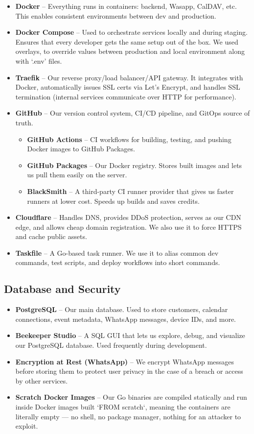 \begin{itemize}
    \item \textbf{Docker} – Everything runs in containers: backend, Wasapp, CalDAV, etc. This enables consistent environments between dev and production.
    \item \textbf{Docker Compose} – Used to orchestrate services locally and during staging. Ensures that every developer gets the same setup out of the box. We used overlays, to override values between production and local environment along with `.env' files.
    \item \textbf{Traefik} – Our reverse proxy/load balancer/API gateway. It integrates with Docker, automatically issues SSL certs via Let's Encrypt, and handles SSL termination (internal services communicate over HTTP for performance).
    \item \textbf{GitHub} – Our version control system, CI/CD pipeline, and GitOps source of truth.
    \begin{itemize}
        \item \textbf{GitHub Actions} – CI workflows for building, testing, and pushing Docker images to GitHub Packages.
        \item \textbf{GitHub Packages} – Our Docker registry. Stores built images and lets us pull them easily on the server.
        \item \textbf{BlackSmith} – A third-party CI runner provider that gives us faster runners at lower cost. Speeds up builds and saves credits.
    \end{itemize}
    \item \textbf{Cloudflare} – Handles DNS, provides DDoS protection, serves as our CDN edge, and allows cheap domain registration. We also use it to force HTTPS and cache public assets.
    \item \textbf{Taskfile} – A Go-based task runner. We use it to alias common dev commands, test scripts, and deploy workflows into short commands.
\end{itemize}

\subsection{Database and Security}

\begin{itemize}
    \item \textbf{PostgreSQL} – Our main database. Used to store customers, calendar connections, event metadata, WhatsApp messages, device IDs, and more.
    \item \textbf{Beekeeper Studio} – A SQL GUI that lets us explore, debug, and visualize our PostgreSQL database. Used frequently during development.
    \item \textbf{Encryption at Rest (WhatsApp)} – We encrypt WhatsApp messages before storing them to protect user privacy in the case of a breach or access by other services.
    \item \textbf{Scratch Docker Images} – Our Go binaries are compiled statically and run inside Docker images built `FROM scratch`, meaning the containers are literally empty — no shell, no package manager, nothing for an attacker to exploit.
\end{itemize}

